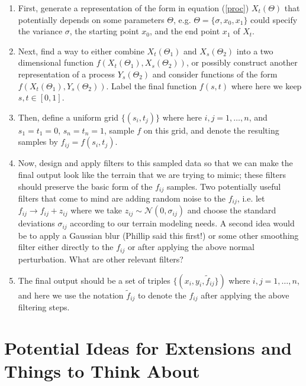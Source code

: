 \documentclass{amsart}
\begin{document}
\begin{enumerate}
    \item First, generate a representation of the form in equation (\ref{proc})
        $X_t(\Theta)$ that potentially depends on some parameters $\Theta$, e.g. 
        $\Theta=\{\sigma,x_0,x_1\}$ could specify the variance $\sigma$, the starting 
        point $x_0$, and the end point $x_1$ of $X_t$.
    \item Next, find a way to either combine $X_t(\Theta_1)$ and $X_s(\Theta_2)$ 
        into a two dimensional function $f(X_t(\Theta_1), X_s(\Theta_2))$, or 
        possibly construct another representation of a process $Y_s(\Theta_2)$ 
        and consider functions of the form $f(X_t(\Theta_1), Y_s(\Theta_2))$. Label 
        the final function $f(s,t)$ where here we keep $s,t\in[0,1]$.
    \item Then, define a uniform grid $\{(s_i,t_j)\}$ where here $i,j=1,\ldots,n$, 
        and $s_1=t_1=0$, $s_n=t_n=1$, sample $f$ on this grid, and denote the 
        resulting samples by $f_{ij} = f(s_i,t_j)$.
    \item Now, design and apply filters to this sampled data so that we can 
        make the final output look like the terrain that we are trying to mimic; these 
        filters should preserve the basic form of the $f_{ij}$ samples.
        Two potentially useful filters that come to mind are adding random noise to the 
        $f_{ij}$, i.e. let $f_{ij}\rightarrow f_{ij} + z_{ij}$ where 
        we take $z_{ij}\sim\mathcal{N}(0,\sigma_{ij})$ and choose the 
        standard deviations $\sigma_{ij}$ according to our terrain modeling needs.
        A second idea would be to apply a Gaussian blur (Phillip said this first!)
        or some other smoothing filter either directly to the $f_{ij}$ or after 
        applying the above normal perturbation. What are other relevant filters? 
    \item The final output should be a set of triples $\{(x_i,y_i,\tilde{f}_{ij}\})$
        where $i,j=1,\ldots,n$, and here
        we use the notation $\tilde{f}_{ij}$ to denote the $f_{ij}$ 
        after applying the above filtering steps.
\end{enumerate}

\section{Potential Ideas for Extensions and Things to Think About}
\end{document}
